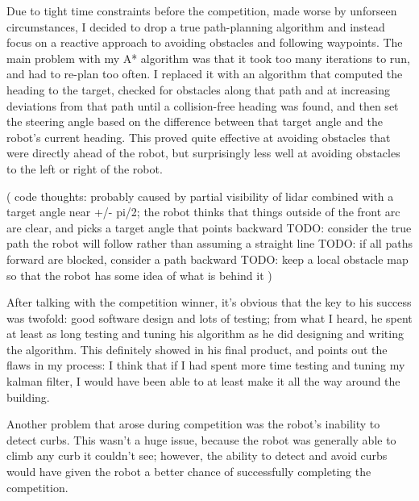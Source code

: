 
Due to tight time constraints before the competition, made worse by unforseen circumstances, I decided to drop a true path-planning algorithm and instead focus on a reactive approach to avoiding obstacles and following waypoints. The main problem with my A* algorithm was that it took too many iterations to run, and had to re-plan too often. I replaced it with an algorithm that computed the heading to the target, checked for obstacles along that path and at increasing deviations from that path until a collision-free heading was found, and then set the steering angle based on the difference between that target angle and the robot's current heading. This proved quite effective at avoiding obstacles that were directly ahead of the robot, but surprisingly less well at avoiding obstacles to the left or right of the robot.

( code thoughts:
  probably caused by partial visibility of lidar combined with a target angle near +/- pi/2; the robot thinks that things outside of the front arc are clear, and picks a target angle that points backward
  TODO: consider the true path the robot will follow rather than assuming a straight line
  TODO: if all paths forward are blocked, consider a path backward
  TODO: keep a local obstacle map so that the robot has some idea of what is behind it
   )

After talking with the competition winner, it's obvious that the key to his success was twofold: good software design and lots of testing; from what I heard, he spent at least as long testing and tuning his algorithm as he did designing and writing the algorithm. This definitely showed in his final product, and points out the flaws in my process: I think that if I had spent more time testing and tuning my kalman filter, I would have been able to at least make it all the way around the building.


Another problem that arose during competition was the robot's inability to detect curbs. This wasn't a huge issue, because the robot was generally able to climb any curb it couldn't see; however, the ability to detect and avoid curbs would have given the robot a better chance of successfully completing the competition.
